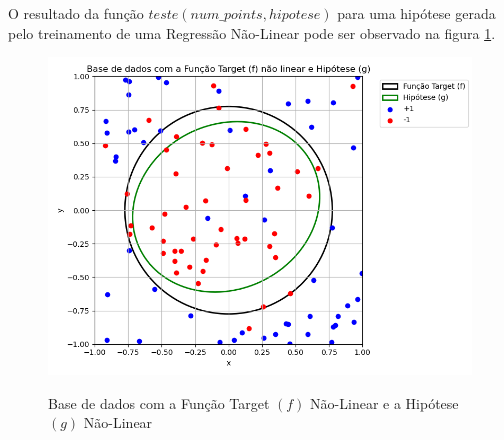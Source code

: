 O resultado da função $teste(num\_points, hipotese)$ para uma hipótese gerada pelo treinamento de uma Regressão Não-Linear pode ser observado na figura \ref{fig:naolinear_naolinear}.

\begin{figure}[H]
    \caption{Base de dados com a Função Target $(f)$ Não-Linear e a Hipótese $(g)$ Não-Linear}
       \centering
       \includegraphics[width=12cm]{naolinear_naolinear.png}
       \label{fig:naolinear_naolinear}
\end{figure}

